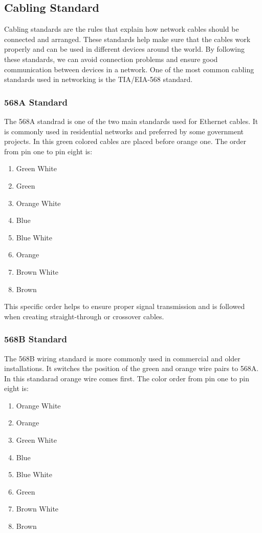 \documentclass[a4paper,12pt]{report}
\begin{document}
\subsection*{Cabling Standard}
Cabling standards are the rules that explain how network cables should be connected and arranged. These standards help make sure that the cables work properly and can be used in different devices around the world. By following these standards, we can avoid connection problems and ensure good communication between devices in a network. One of the most common cabling standards used in networking is the TIA/EIA-568 standard.
\subsubsection*{568A Standard}
The 568A standrad is one of the two main standards used for Ethernet cables. It is commonly used in residential networks and preferred by some government projects. In this green colored cables are placed before orange one. The order from pin one to pin eight is:


\begin{enumerate}
    \item Green White
    \item Green
    \item Orange White
    \item Blue
    \item Blue White
    \item Orange
    \item Brown White
    \item Brown
\end{enumerate}

This specific order helps to ensure proper signal transmission and is followed when creating straight-through or crossover cables.

\subsubsection*{568B Standard}
The 568B wiring standard is more commonly used in commercial and older installations. It switches the position of the green and orange wire pairs to 568A. In this standarad orange wire comes first. The color order from pin one to pin eight is:

\begin{enumerate}
    \item Orange White
    \item Orange
    \item Green White
    \item Blue
    \item Blue White
    \item Green
    \item Brown White
    \item Brown
\end{enumerate}
\end{document}
